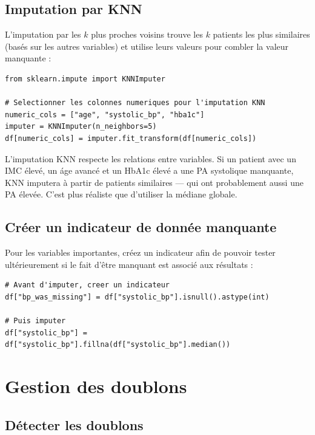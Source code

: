 \subsection{Imputation par KNN}

L'imputation par les $k$ plus proches voisins trouve les $k$ patients les plus similaires (bas\'es sur les autres variables) et utilise leurs valeurs pour combler la valeur manquante :

\begin{verbatim}
from sklearn.impute import KNNImputer

# Selectionner les colonnes numeriques pour l'imputation KNN
numeric_cols = ["age", "systolic_bp", "hba1c"]
imputer = KNNImputer(n_neighbors=5)
df[numeric_cols] = imputer.fit_transform(df[numeric_cols])
\end{verbatim}

\begin{pythontip}
L'imputation KNN respecte les relations entre variables. Si un patient avec un IMC \'elev\'e, un \'age avanc\'e et un HbA1c \'elev\'e a une PA systolique manquante, KNN imputera \`a partir de patients similaires --- qui ont probablement aussi une PA \'elev\'ee. C'est plus r\'ealiste que d'utiliser la m\'ediane globale.
\end{pythontip}

\subsection{Cr\'eer un indicateur de donn\'ee manquante}

Pour les variables importantes, cr\'eez un indicateur afin de pouvoir tester ult\'erieurement si le fait d'\^etre manquant est associ\'e aux r\'esultats :

\begin{verbatim}
# Avant d'imputer, creer un indicateur
df["bp_was_missing"] = df["systolic_bp"].isnull().astype(int)

# Puis imputer
df["systolic_bp"] = df["systolic_bp"].fillna(df["systolic_bp"].median())
\end{verbatim}

\section{Gestion des doublons}

\subsection{D\'etecter les doublons}

